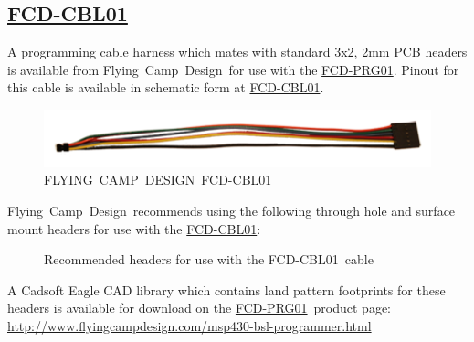 \documentclass[10pt,letterpaper]{datasheet}
\newcommand{\PIDNOLINK}{FCD\nobreakdash-PRG01}
\newcommand{\PID}{\href{http://www.flyingcampdesign.com/msp430-bsl-programmer.html}{\PIDNOLINK}}
\newcommand{\PIDURL}{\href{http://www.flyingcampdesign.com/msp430-bsl-programmer.html}{http://www.flyingcampdesign.com/msp430-bsl-programmer.html}}
\newcommand{\PIDCBLNOLINK}{FCD-CBL01}
\newcommand{\PIDCBL}{\href{http://www.flyingcampdesign.com/msp430-bsl-programmer.html}{\PIDCBLNOLINK}}
\newcommand{\fcd}{Flying~Camp~Design}
\newcommand{\FCD}{FLYING~CAMP~DESIGN}
\begin{document}
\subsection*{\PIDCBL}
\begin{flushleft}
  A programming cable harness which mates with standard 3x2, 2mm PCB headers is available from \fcd\ for use with the \PID.  Pinout for this cable is available in schematic form at \PIDCBL.

  \begin{figure}[!h]
    \label{fig:fcd-cbl01}
    \begin{center}
      \includegraphics[]{fcd-cbl01}
    \end{center}
    \caption{\FCD\ \PIDCBLNOLINK}
  \end{figure}

  \fcd\ recommends using the following through hole and surface mount headers for use with the \PIDCBL:

  \begin{figure}[!h]
    \label{fig:rec-prog-hdr}
    \begin{center}
      \caption{Recommended headers for use with the \PIDCBLNOLINK\ cable}
    \end{center}
  \end{figure}

  A Cadsoft Eagle CAD library which contains land pattern footprints for these headers is available for download on the \PID\ product page: \PIDURL \newline


\end{flushleft}
\end{document}
